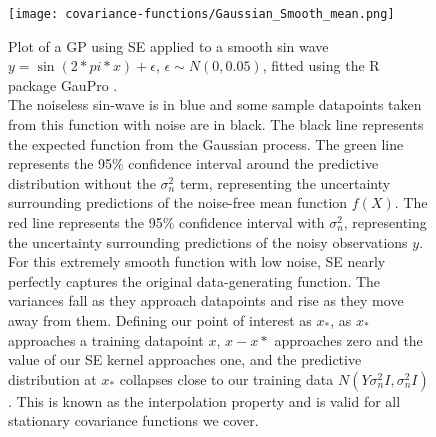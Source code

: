 \begin{figure}[H]
    \texttt{[image: covariance-functions/Gaussian\_Smooth\_mean.png]}
    \caption{
        Plot of a GP using SE applied to a smooth sin wave $y = \sin(2 * pi * x) + \epsilon$, $\epsilon \sim N(0, 0.05)$, fitted using the R package GauPro \cite{gaupro}. \\
        The noiseless sin-wave is in blue and some sample datapoints taken from this function with noise are in black. The black line represents the expected function from the Gaussian process. The green line represents the 95\% confidence interval around the predictive distribution without the $\sigma^2_n$ term, representing the uncertainty surrounding predictions of the noise-free mean function $f(X)$. The red line represents the 95\% confidence interval with $\sigma^2_n$, representing the uncertainty surrounding predictions of the noisy observations $y$. \\
        For this extremely smooth function with low noise, SE nearly perfectly captures the original data-generating function. The variances fall as they approach datapoints and rise as they move away from them. Defining our point of interest as $x_*$, as $x_*$ approaches a training datapoint $x$, $x - x*$ approaches zero and the value of our SE kernel approaches one, and the predictive distribution at $x_*$ collapses close to our training data $N(Y \sigma_n^2I, \sigma_n^2I)$. This is known as the interpolation property \cite{gp-ml} and is valid for all stationary covariance functions we cover.
    }
\end{figure}

